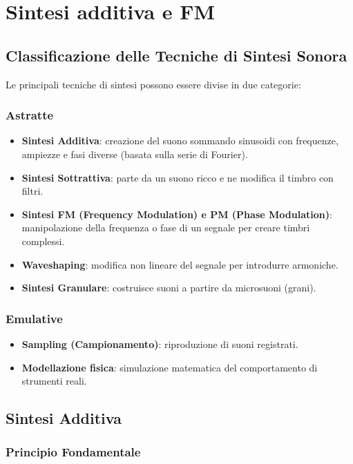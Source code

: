 
\chapter{Sintesi additiva e FM}
\section{Classificazione delle Tecniche di Sintesi Sonora}

Le principali tecniche di sintesi possono essere divise in due categorie:

\subsection*{Astratte}

\begin{itemize}
    \item \textbf{Sintesi Additiva}: creazione del suono sommando sinusoidi con frequenze, ampiezze e fasi diverse (basata sulla serie di Fourier).
    \item \textbf{Sintesi Sottrattiva}: parte da un suono ricco e ne modifica il timbro con filtri.
    \item \textbf{Sintesi FM (Frequency Modulation) e PM (Phase Modulation)}: manipolazione della frequenza o fase di un segnale per creare timbri complessi.
    \item \textbf{Waveshaping}: modifica non lineare del segnale per introdurre armoniche.
    \item \textbf{Sintesi Granulare}: costruisce suoni a partire da microsuoni (grani).
\end{itemize}

\subsection*{Emulative}

\begin{itemize}
    \item \textbf{Sampling (Campionamento)}: riproduzione di suoni registrati.
    \item \textbf{Modellazione fisica}: simulazione matematica del comportamento di strumenti reali.
\end{itemize}

\section{Sintesi Additiva}

\subsection*{Principio Fondamentale}

